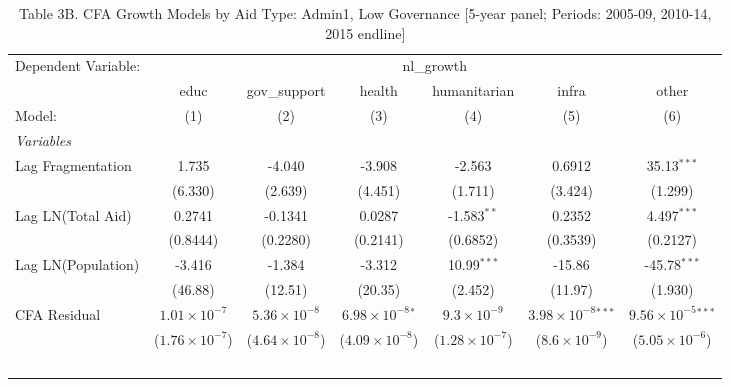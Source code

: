 \begin{table}[H]
   \caption{Table 3B. CFA Growth Models by Aid Type: Admin1, Low Governance [5-year panel; Periods: 2005-09, 2010-14, 2015 endline]}
   \centering
   \begin{tabular}{lcccccc}
      \tabularnewline \midrule \midrule
      Dependent Variable: & \multicolumn{6}{c}{nl\_growth}\\
                         & educ                    & gov\_support            & health                      & humanitarian            & infra                         & other \\   
      Model:             & (1)                     & (2)                     & (3)                         & (4)                     & (5)                           & (6)\\  
      \midrule
      \emph{Variables}\\
      Lag Fragmentation  & 1.735                   & -4.040                  & -3.908                      & -2.563                  & 0.6912                        & 35.13$^{***}$\\   
                         & (6.330)                 & (2.639)                 & (4.451)                     & (1.711)                 & (3.424)                       & (1.299)\\   
      Lag LN(Total Aid)  & 0.2741                  & -0.1341                 & 0.0287                      & -1.583$^{**}$           & 0.2352                        & 4.497$^{***}$\\   
                         & (0.8444)                & (0.2280)                & (0.2141)                    & (0.6852)                & (0.3539)                      & (0.2127)\\   
      Lag LN(Population) & -3.416                  & -1.384                  & -3.312                      & 10.99$^{***}$           & -15.86                        & -45.78$^{***}$\\   
                         & (46.88)                 & (12.51)                 & (20.35)                     & (2.452)                 & (11.97)                       & (1.930)\\   
      CFA Residual       & $1.01\times 10^{-7}$    & $5.36\times 10^{-8}$    & $6.98\times 10^{-8}$$^{*}$  & $9.3\times 10^{-9}$     & $3.98\times 10^{-8}$$^{***}$  & $9.56\times 10^{-5}$$^{***}$\\    
                         & ($1.76\times 10^{-7}$)  & ($4.64\times 10^{-8}$)  & ($4.09\times 10^{-8}$)      & ($1.28\times 10^{-7}$)  & ($8.6\times 10^{-9}$)         & ($5.05\times 10^{-6}$)\\    
$$
\end{tabular}
\end{table}
